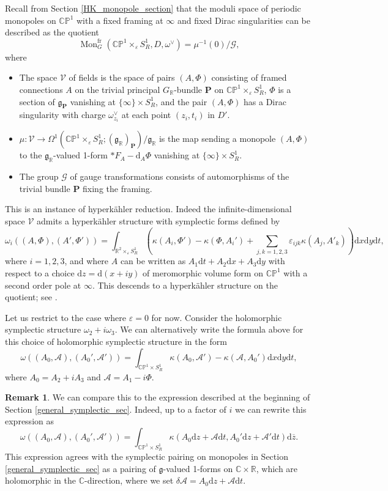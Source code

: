 \documentclass[11pt, oneside, reqno]{amsart}
\theoremstyle{definition} \newtheorem{definition}{Definition}[section]
\theoremstyle{definition} \newtheorem{remark}[definition]{Remark}
\theoremstyle{definition} \newtheorem{remarks}[definition]{Remarks}
\theoremstyle{definition} \newtheorem{question}[definition]{Question}
\theoremstyle{definition} \newtheorem*{note}{Note}
\theoremstyle{definition} \newtheorem{example}[definition]{Example}
\theoremstyle{definition} \newtheorem{examples}[definition]{Examples}
\renewcommand{\gg}{\mathfrak{g}}
\newcommand{\bb}[1]{\mathbb{#1}}
\newcommand{\mc}[1]{\mathcal{#1}}
\newcommand{\bo}[1]{\boldsymbol{#1}}
\newcommand{\ol}[1]{\overline{#1}}
\newcommand{\CC}{\mathbb{C}}
\newcommand{\RR}{\mathbb{R}}
\newcommand{\eps}{\varepsilon}
\DeclareMathOperator{\mon}{Mon}
\renewcommand{\d}{\mathrm{d}}
\newcommand{\fr}{\mathrm{fr}}
\begin{document}
Recall from Section \ref{HK_monopole_section} that the moduli space of periodic monopoles on $\bb{CP}^1$ with a fixed framing at $\infty$ and fixed Dirac singularities can be described as the quotient 
\[\mon_G^{\fr}(\bb{CP}^1 \times_\eps S^1_R, D, \omega^\vee) = \mu^{-1}(0)/\mc G,\]
where 
\begin{itemize}
\item The space $\mc V$ of fields is the space of pairs $(A,\Phi)$ consisting of framed connections $A$ on the trivial principal $G_\RR$-bundle $\bo P$ on $\bb{CP}^1 \times_\eps S^1_R$, $\Phi$ is a section of $\gg_{\bo P}$ vanishing at $\{\infty\} \times S^1_R$, and the pair $(A,\Phi)$ has a Dirac singularity with charge $\omega^\vee_{z_i}$ at each point $(z_i,t_i)$ in $D'$.
\item $\mu \colon \mc V \to \Omega^1(\bb{CP}^1 \times_\eps S^1_R; (\gg_\RR)_{\bo P})/\gg_\RR$ is the map sending a monopole $(A, \Phi)$ to the $\gg_\RR$-valued 1-form $\ast F_A - \d_A \Phi$ vanishing at $\{\infty\} \times S^1_R$.  
\item The group $\mc G$ of gauge transformations consists of automorphisms of the trivial bundle $\bo P$ fixing the framing.
\end{itemize}

This is an instance of hyperk\"ahler reduction.  Indeed the infinite-dimensional space $\mc V$ admits a hyperk\"ahler structure with symplectic forms defined by
\[\omega_i((A,\Phi),(A',\Phi')) = \int_{\RR^2 \times_\eps S^1_R} \left(\kappa(A_i,\Phi') - \kappa(\Phi, A_i') + \sum_{j,k=1,2,3} \eps_{ijk} \kappa(A_j,A'_k)\right) \d x \d y \d t, \]
where $i=1,2,3$, and where $A$ can be written as $A_1 \d t + A_2 \d x + A_3 \d y$ with respect to a choice $\d z = \d (x + iy)$ of meromorphic volume form on $\bb{CP}^1$ with a second order pole at $\infty$.  This descends to a hyperk\"ahler structure on the quotient; see \cite[Section 1.4.2]{FoscoloThesis}.

Let us restrict to the case where $\eps=0$ for now.  Consider the holomorphic symplectic structure $\omega_2 + i \omega_3$.  We can alternatively write the formula above for this choice of holomorphic symplectic structure in the form
\[\omega((A_0, \mc A), (A_0', \mc A')) = \int_{\bb{CP}^1 \times S^1_R} \kappa(A_0, \mc A') - \kappa(\mc A, A_0') \d x \d y \d t,\]
where $A_0 = A_2 + i A_3$ and $\mc A = A_1 - i \Phi$.  

\begin{remark}
We can compare this to the expression described at the beginning of Section \ref{general_symplectic_sec}. Indeed, up to a factor of $i$ we can rewrite this expression as
\[\omega((A_0, \mc A), (A_0', \mc A')) = \int_{\bb{CP}^1 \times S^1_R} \kappa(A_0\d z + \mc A \d t, A_0' \d z + \mc A' \d t) \d \ol{z}.\]
This expression agrees with the symplectic pairing on monopoles in Section \ref{general_symplectic_sec} as a pairing of $\gg$-valued 1-forms on $\CC \times \RR$, which are holomorphic in the $\CC$-direction, where we set $\delta \mc A = A_0\d z + \mc A \d t$.
\end{remark}
\end{document}
